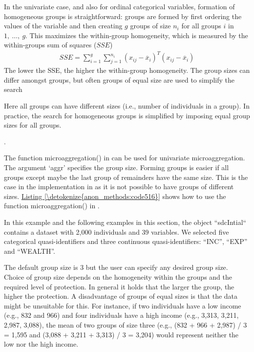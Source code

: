 \documentclass[letterpaper,10pt,english]{sphinxmanual}
\begin{document}
In the univariate case, and also for ordinal categorical variables,
formation of homogeneous groups is straightforward: groups are formed by
first ordering the values of the variable and then creating \(g\)
groups of size \(n_{i}\) for all groups \(i\) in
\(1,\ \ldots,\ g\). This maximizes the within-group homogeneity,
which is measured by the within-groups sum of squares (\(SSE\))
\begin{equation*}
\begin{split}SSE = \sum_{i = 1}^{g}{\sum_{j = 1}^{n_{i}}{\left( x_{ij} - {\overline{x}}_{i} \right)^{T}\left( x_{ij} - {\overline{x}}_{i} \right)}}\end{split}
\end{equation*}
The lower the SSE, the higher the within-group homogeneity. The group
sizes can differ amongst groups, but often groups of equal size are used
to simplify the search %
\begin{footnote}[15]\sphinxAtStartFootnote
Here all groups can have different sizes (i.e., number of
individuals in a group). In practice, the search for homogeneous
groups is simplified by imposing equal group sizes for all groups.
%
\end{footnote}.

The function microaggregation() in  can be used for univariate
microaggregation. The argument ‘aggr’ specifies the group size. Forming
groups is easier if all groups \textendash{} except maybe the last group of
remainders \textendash{} have the same size. This is the case in the implementation
in  as it is not possible to have groups of different sizes.
\hyperref[\detokenize{anon_methods:code516}]{Listing \ref{\detokenize{anon_methods:code516}}} shows how to use the function microaggregation() in
. %
\begin{footnote}[16]\sphinxAtStartFootnote
In this example and the following examples in this section, the
 object “sdcIntial“ contains a dataset with 2,000
individuals and 39 variables. We selected five categorical
quasi-identifiers and three continuous quasi-identifiers: “INC”,
“EXP” and “WEALTH”.
%
\end{footnote} The default group size is 3 but the
user can specify any desired group size. Choice of group size depends on
the homogeneity within the groups and the required level of protection.
In general it holds that the larger the group, the higher the
protection. A disadvantage of groups of equal sizes is that the data
might be unsuitable for this. For instance, if two individuals have a
low income (e.g., 832 and 966) and four individuals have a high income
(e.g., 3,313, 3,211, 2,987, 3,088), the mean of two groups of size three
(e.g., (832 + 966 + 2,987) / 3 = 1,595 and (3,088 + 3,211 + 3,313) / 3 =
3,204) would represent neither the low nor the high income.
\end{document}
